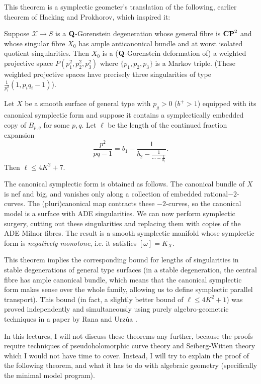 \documentclass{article}
\begin{document}
\begin{Remark}
This theorem is a symplectic geometer's translation of the
following, earlier theorem of Hacking and Prokhorov, which inspired
it:


\end{Remark}
\begin{Theorem}\label{thm:cp2hp}
Suppose \(\mathcal{X}\to S\) is a \(\mathbf{Q}\)-Gorenstein degeneration
whose general fibre is \(\mathbf{CP}^{2}\) and whose singular fibre \(X_0\)
has ample anticanonical bundle and at worst isolated quotient
singularities. Then \(X_0\) is a (\(\mathbf{Q}\)-Gorenstein deformation of)
a weighted projective space \(P(p_1^2,p_2^2,p_3^2)\) where
\(\{p_1,p_2,p_3\}\) is a Markov triple. (These weighted projective
spaces have precisely three singularities of type
\(\frac{1}{p_i^2}(1,p_iq_i-1)\)).


\end{Theorem}
\begin{Theorem}\label{thm:gtes}
Let \(X\) be a smooth surface of general type with \(p_g>0\)
(\(b^+>1\)) equipped with its canonical symplectic form and suppose
it contains a symplectically embedded copy of \(B_{p,q}\) for some
\(p,q\). Let \(\ell\) be the length of the continued fraction
expansion
\[\frac{p^2}{pq-1}=b_1-\frac{1}{b_2-\frac{1}{\cdots-\frac{1}{b_\ell}}}.\]
Then \(\ell\leq 4K^2+7\).


\end{Theorem}
\begin{Remark}
The canonical symplectic form is obtained as follows. The canonical
bundle of \(X\) is nef and big, and vanishes only along a collection
of embedded rational\(-2\)-curves. The (pluri)canonical map
contracts these \(-2\)-curves, so the canonical model is a surface
with ADE singularities. We can now perform symplectic surgery,
cutting out these singularities and replacing them with copies of
the ADE Milnor fibres. The result is a smooth symplectic manifold
whose symplectic form is {\em negatively monotone}, i.e. it
satisfies \([\omega]=K_X\).


\end{Remark}
\begin{Remark}
This theorem implies the corresponding bound for lengths of
singularities in stable degenerations of general type surfaces (in a
stable degeneration, the central fibre has ample canonical bundle,
which means that the canonical symplectic form makes sense over the
whole family, allowing us to define symplectic parallel
transport). This bound (in fact, a slightly better bound of
\(\ell\leq 4K^2+1\)) was proved independently and simultaneously
using purely algebro-geometric techniques in a paper by Rana and
Urz\'{u}a \cite{RU}.


\end{Remark}
In this lectures, I will not discuss these theorems any further,
because the proofs require techniques of pseudoholomorphic curve
theory and Seiberg-Witten theory which I would not have time to
cover. Instead, I will try to explain the proof of the following
theorem, and what it has to do with algebraic geometry (specifically
the minimal model program).
\end{document}
